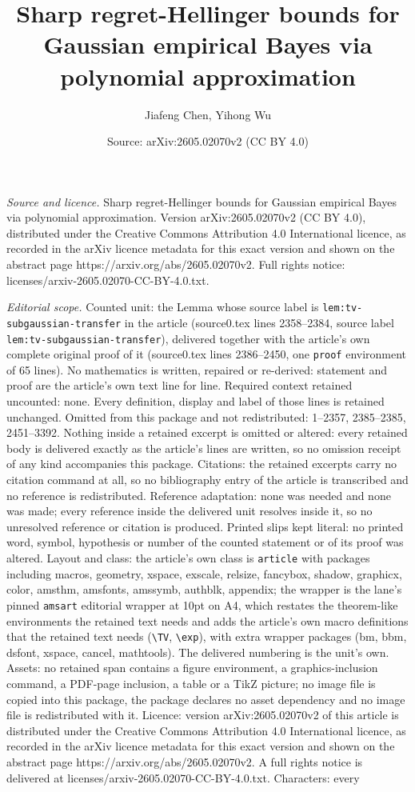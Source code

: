 \documentclass[10pt,a4paper]{amsart}
\title[Sharp regret-Hellinger bounds for Gaussian empirical Bayes v]{Sharp regret-Hellinger bounds for Gaussian empirical Bayes via polynomial approximation}
\author{Jiafeng Chen, Yihong Wu}
\date{Source: arXiv:2605.02070v2 (CC BY 4.0)}
\begin{document}
\maketitle

\noindent\emph{Source and licence.} Sharp regret-Hellinger bounds for Gaussian empirical Bayes via polynomial approximation. Version arXiv:2605.02070v2 (CC BY 4.0), distributed under the Creative Commons Attribution 4.0 International licence, as recorded in the arXiv licence metadata for this exact version and shown on the abstract page https://arxiv.org/abs/2605.02070v2. Full rights notice: licenses/arxiv-2605.02070-CC-BY-4.0.txt.\par\smallskip

\noindent\textit{Editorial scope.} Counted unit: the Lemma whose source label is \texttt{lem:tv-subgaussian-transfer} in the article (source0.tex lines 2358--2384, source label \texttt{lem:tv-subgaussian-transfer}), delivered together with the article's own complete original proof of it (source0.tex lines 2386--2450, one \texttt{proof} environment of 65 lines). No mathematics is written, repaired or re-derived: statement and proof are the article's own text line for line. Required context retained uncounted: none. Every definition, display and label of those lines is retained unchanged. Omitted from this package and not redistributed: 1--2357, 2385--2385, 2451--3392. Nothing inside a retained excerpt is omitted or altered: every retained body is delivered exactly as the article's lines are written, so no omission receipt of any kind accompanies this package. Citations: the retained excerpts carry no citation command at all, so no bibliography entry of the article is transcribed and no reference is redistributed. Reference adaptation: none was needed and none was made; every reference inside the delivered unit resolves inside it, so no unresolved reference or citation is produced. Printed slips kept literal: no printed word, symbol, hypothesis or number of the counted statement or of its proof was altered. Layout and class: the article's own class is \texttt{article} with packages including macros, geometry, xspace, exscale, relsize, fancybox, shadow, graphicx, color, amsthm, amsfonts, amssymb, authblk, appendix; the wrapper is the lane's pinned \texttt{amsart} editorial wrapper at 10pt on A4, which restates the theorem-like environments the retained text needs and adds the article's own macro definitions that the retained text needs (\texttt{\textbackslash TV}, \texttt{\textbackslash exp}), with extra wrapper packages (bm, bbm, dsfont, xspace, cancel, mathtools). The delivered numbering is the unit's own. Assets: no retained span contains a figure environment, a graphics-inclusion command, a PDF-page inclusion, a table or a TikZ picture; no image file is copied into this package, the package declares no asset dependency and no image file is redistributed with it. Licence: version arXiv:2605.02070v2 of this article is distributed under the Creative Commons Attribution 4.0 International licence, as recorded in the arXiv licence metadata for this exact version and shown on the abstract page https://arxiv.org/abs/2605.02070v2. A full rights notice is delivered at licenses/arxiv-2605.02070-CC-BY-4.0.txt. Characters: every 
\end{document}

